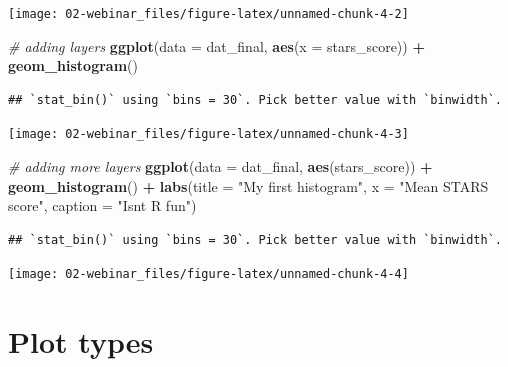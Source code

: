 \documentclass[
  oneside]{book}
\newenvironment{Shaded}{\begin{snugshade}}{\end{snugshade}}
\newcommand{\AttributeTok}[1]{\textcolor[rgb]{0.13,0.29,0.53}{#1}}
\newcommand{\CommentTok}[1]{\textcolor[rgb]{0.56,0.35,0.01}{\textit{#1}}}
\newcommand{\FunctionTok}[1]{\textcolor[rgb]{0.13,0.29,0.53}{\textbf{#1}}}
\newcommand{\NormalTok}[1]{#1}
\newcommand{\SpecialCharTok}[1]{\textcolor[rgb]{0.81,0.36,0.00}{\textbf{#1}}}
\newcommand{\StringTok}[1]{\textcolor[rgb]{0.31,0.60,0.02}{#1}}
\begin{document}
\begin{center}\texttt{[image: 02-webinar\_files/figure-latex/unnamed-chunk-4-2]} \end{center}

\begin{Shaded}
\begin{Highlighting}[]
\CommentTok{\# adding layers}
\FunctionTok{ggplot}\NormalTok{(}\AttributeTok{data =}\NormalTok{ dat\_final, }\FunctionTok{aes}\NormalTok{(}\AttributeTok{x =}\NormalTok{ stars\_score)) }\SpecialCharTok{+}
  \FunctionTok{geom\_histogram}\NormalTok{()}
\end{Highlighting}
\end{Shaded}

\begin{verbatim}
## `stat_bin()` using `bins = 30`. Pick better value with `binwidth`.
\end{verbatim}

\begin{center}\texttt{[image: 02-webinar\_files/figure-latex/unnamed-chunk-4-3]} \end{center}

\begin{Shaded}
\begin{Highlighting}[]
\CommentTok{\# adding more layers}
\FunctionTok{ggplot}\NormalTok{(}\AttributeTok{data =}\NormalTok{ dat\_final, }\FunctionTok{aes}\NormalTok{(stars\_score)) }\SpecialCharTok{+}
  \FunctionTok{geom\_histogram}\NormalTok{() }\SpecialCharTok{+}
  \FunctionTok{labs}\NormalTok{(}\AttributeTok{title =} \StringTok{"My first histogram"}\NormalTok{,}
       \AttributeTok{x =} \StringTok{"Mean STARS score"}\NormalTok{,}
       \AttributeTok{caption =} \StringTok{"Isn\textquotesingle{}t R fun"}\NormalTok{)}
\end{Highlighting}
\end{Shaded}

\begin{verbatim}
## `stat_bin()` using `bins = 30`. Pick better value with `binwidth`.
\end{verbatim}

\begin{center}\texttt{[image: 02-webinar\_files/figure-latex/unnamed-chunk-4-4]} \end{center}

\section{Plot types}\label{plot-types}
\end{document}
